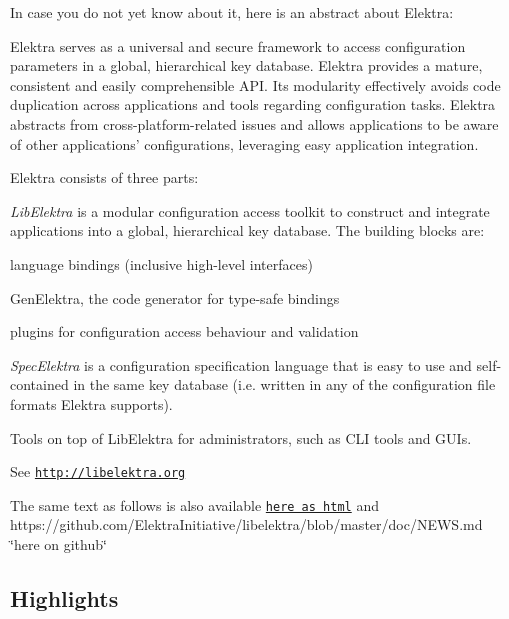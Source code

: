 In case you do not yet know about it, here is an abstract about Elektra\+:

Elektra serves as a universal and secure framework to access configuration parameters in a global, hierarchical key database. Elektra provides a mature, consistent and easily comprehensible A\+P\+I. Its modularity effectively avoids code duplication across applications and tools regarding configuration tasks. Elektra abstracts from cross-\/platform-\/related issues and allows applications to be aware of other applications' configurations, leveraging easy application integration.

Elektra consists of three parts\+:


\begin{DoxyEnumerate}
\item {\itshape Lib\+Elektra} is a modular configuration access toolkit to construct and integrate applications into a global, hierarchical key database. The building blocks are\+:
\begin{DoxyItemize}
\item language bindings (inclusive high-\/level interfaces)
\item Gen\+Elektra, the code generator for type-\/safe bindings
\item plugins for configuration access behaviour and validation
\end{DoxyItemize}
\item {\itshape Spec\+Elektra} is a configuration specification language that is easy to use and self-\/contained in the same key database (i.\+e. written in any of the configuration file formats Elektra supports).
\item Tools on top of Lib\+Elektra for administrators, such as C\+L\+I tools and G\+U\+Is.
\end{DoxyEnumerate}

See \href{http://libelektra.org}{\tt http\+://libelektra.\+org}

The same text as follows is also available \href{http://doc.libelektra.org/news/9c9247ee-ee9c-4f4a-a68e-76959def9b82.html}{\tt here as html} and https\+://github.com/\+Elektra\+Initiative/libelektra/blob/master/doc/\+N\+E\+W\+S.\+md \char`\"{}here on github\char`\"{}

\subsection*{Highlights}



